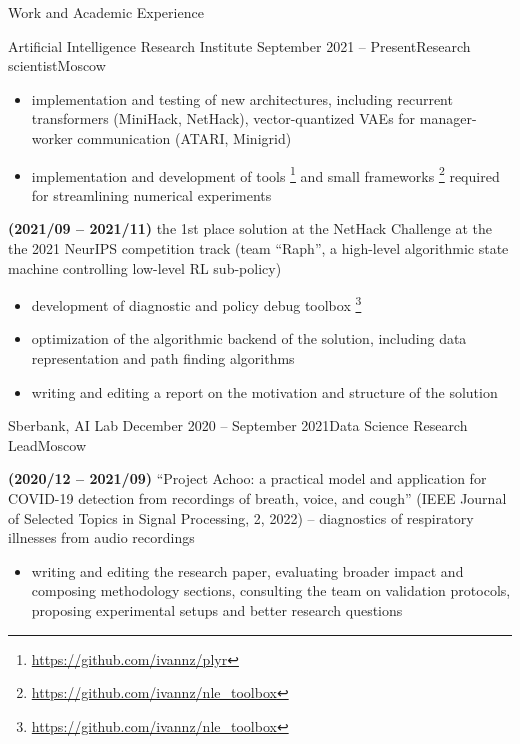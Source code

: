 \documentclass{resume} %
\begin{document}
\begin{rSection}{Work and Academic Experience}
\begin{rSubsection}{
        Artificial Intelligence Research Institute
    }{September 2021 -- Present}{Research scientist}{Moscow}
\begin{itemize}
        \item implementation and testing of new architectures, including recurrent transformers (MiniHack, NetHack), vector-quantized VAEs for manager-worker communication (ATARI, Minigrid)
        
        \item implementation and development of tools%
        \footnote{
            \url{https://github.com/ivannz/plyr}
        }
        and small frameworks%
        \footnote{
            \url{https://github.com/ivannz/nle_toolbox}
        }
        required for streamlining numerical experiments
    \end{itemize}

    \item \textbf{(2021/09 -- 2021/11)}
    the 1st place solution at the NetHack Challenge at the the 2021 NeurIPS competition track (team ``Raph'', a high-level algorithmic state machine controlling low-level RL sub-policy)
    \begin{itemize}
        \item development of diagnostic and policy debug toolbox%
        \footnote{
            \url{https://github.com/ivannz/nle_toolbox}
        }

        \item optimization of the algorithmic backend of the solution, including data representation and path finding algorithms

        \item writing and editing a report on the motivation and structure of the solution
    \end{itemize}
\end{rSubsection}

\begin{rSubsection}{
        Sberbank, AI Lab
    }{December 2020 -- September 2021}{Data Science Research Lead}{Moscow}

    \item \textbf{(2020/12 -- 2021/09)}
    ``Project Achoo: a practical model and application for COVID-19 detection from recordings of breath, voice, and cough'' (IEEE Journal of Selected Topics in Signal Processing, 2, 2022) -- diagnostics of respiratory illnesses from audio recordings

    \begin{itemize}
        \item writing and editing the research paper, evaluating broader impact and composing methodology sections, consulting the team on validation protocols, proposing experimental setups and better research questions


\end{itemize}
\end{rSubsection}
\end{rSection}
\end{document}
